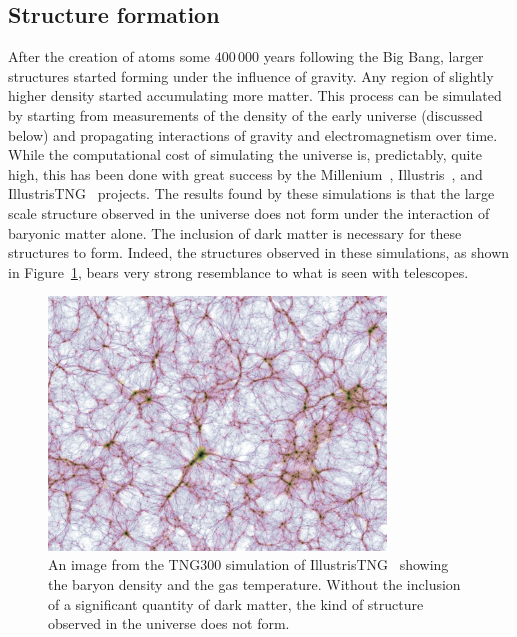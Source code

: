 \subsection{Structure formation}

After the creation of atoms some $400\,000$ years following the Big Bang, larger structures started forming under the influence of gravity. Any region of slightly higher density started accumulating more matter. This process can be simulated by starting from measurements of the density of the early universe (discussed below) and propagating interactions of gravity and electromagnetism over time. While the computational cost of simulating the universe is, predictably, quite high, this has been done with great success by the Millenium~\cite{Springel:2005nw}, Illustris~\cite{Genel:2014lma,Vogelsberger:2014dza,Sijacki:2014yfa}, and IllustrisTNG~\cite{Pillepich:2017jle} projects. The results found by these simulations is that the large scale structure observed in the universe does not form under the interaction of baryonic matter alone. The inclusion of dark matter is necessary for these structures to form. Indeed, the structures observed in these simulations, as shown in Figure~\ref{fig:structure}, bears very strong resemblance to what is seen with telescopes.

\begin{figure}[htb]
    \centering
    \includegraphics[width=0.8\textwidth]{figures/dm/TNG300_gas_dens_temp_hr}
    \caption{An image from the TNG300 simulation of IllustrisTNG~\cite{Pillepich:2017jle} showing the baryon density and the gas temperature. Without the inclusion of a significant quantity of dark matter, the kind of structure observed in the universe does not form.}\label{fig:structure}
\end{figure}

